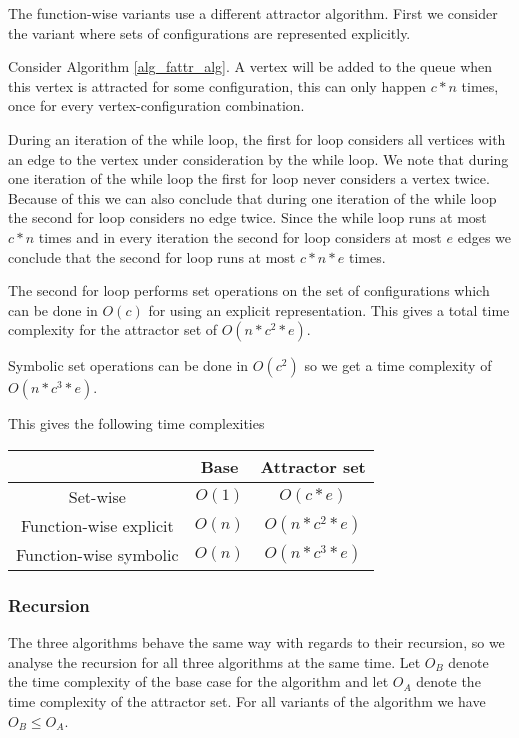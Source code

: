 The function-wise variants use a different attractor algorithm. First we consider the variant where sets of configurations are represented explicitly.

Consider Algorithm \ref{alg_fattr_alg}. A vertex will be added to the queue when this vertex is attracted for some configuration, this can only happen $c*n$ times, once for every vertex-configuration combination. 


During an iteration of the while loop, the first for loop considers all vertices with an edge to the vertex under consideration by the while loop. We note that during one iteration of the while loop the first for loop never considers a vertex twice. Because of this we can also conclude that during one iteration of the while loop the second for loop considers no edge twice. Since the while loop runs at most $c*n$ times and in every iteration the second for loop considers at most $e$ edges we conclude that the second for loop runs at most $c*n*e$ times. 

The second for loop performs set operations on the set of configurations which can be done in $O(c)$ for using an explicit representation. This gives a total time complexity for the attractor set of $O(n*c^2*e)$.

Symbolic set operations can be done in $O(c^2)$ so we get a time complexity of $O(n*c^3*e)$.

This gives the following time complexities\\
\begin{center}
	\begin{tabular}{|c|c|c|}
		\hline 
		& Base & Attractor set \\ 
		\hline 
		Set-wise & $O(1)$ & $O(c*e)$  \\ 
		\hline 
		Function-wise explicit & $O(n)$ &  $O(n*c^2*e)$ \\ 
		\hline 
		Function-wise symbolic & $O(n)$ &  $O(n* c^3*e)$ \\ 
		\hline 
	\end{tabular} 
\end{center}

\subsubsection{Recursion} The three algorithms behave the same way with regards to their recursion, so we analyse the recursion for all three algorithms at the same time. Let $O_B$ denote the time complexity of the base case for the algorithm and let $O_A$ denote the time complexity of the attractor set. For all variants of the algorithm we have $O_B \leq O_A$.

